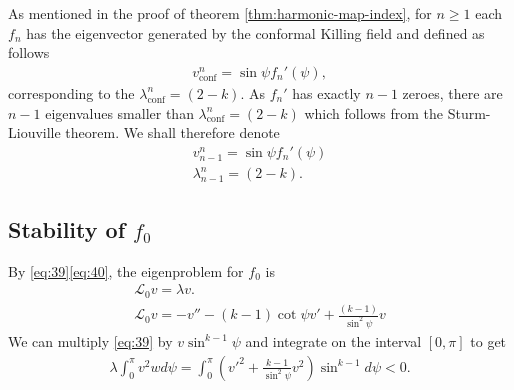 As mentioned in the proof of theorem \ref{thm:harmonic-map-index}, for
$n\ge1$ each $f_n$ has the eigenvector generated by the conformal
Killing field and defined as follows
\begin{align}
  \label{eq:42}
  v_{\text{conf}}^n=\sin\psi f_n'(\psi),
\end{align}
corresponding to the $\lambda_{\text{conf}}^n=(2-k)$. As $f_n'$ has
exactly $n-1$ zeroes, there are $n-1$ eigenvalues smaller than
$\lambda_{\text{conf}}^n=(2-k)$ which follows from the Sturm-Liouville
theorem. We shall therefore denote
\begin{align}
  \label{eq:43}
  v_{n-1}^n=\sin\psi f_n'(\psi)\\
  \lambda_{n-1}^n=(2-k).
\end{align}

\subsection{Stability of $f_0$}
\label{sec:stability-f_0}

By \eqref{eq:39}\eqref{eq:40}, the eigenproblem for $f_0$ is
\begin{align}
  \label{eq:45}
  \mathcal{L}_0 v = \lambda v. \\
  \label{eq:46}
  \mathcal{L}_0 v = -v''-(k-1)\cot\psi v'+\frac{(k-1)}{\sin^2\psi}v
\end{align}
We can multiply \eqref{eq:39} by $v\sin^{k-1}\psi$ and integrate on
the interval $[0,\pi]$ to get
\begin{align}\label{eq:47}
  \lambda\int_0^\pi v^2w
  d\psi=\int_0^\pi\left(v'^2+\frac{k-1}{\sin^2\psi}v^2\right)\sin^{k-1}d\psi<0.
\end{align}

